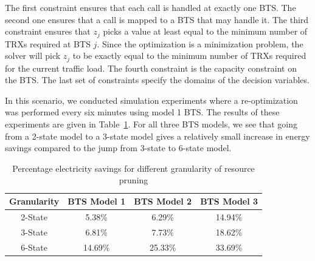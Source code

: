 The first constraint ensures that each call is handled at exactly one BTS. The second one ensures that a call is mapped to a BTS that may handle it. The third constraint ensures that $z_j$ picks a value at least equal to the minimum number of TRXs required at BTS $j$. Since the optimization is a minimization problem, the solver will pick $z_j$ to be exactly equal to the minimum number of TRXs required for the current traffic load. The fourth constraint is the capacity constraint on the BTS. The last set of constraints specify the domains of the decision variables.

In this scenario, we conducted simulation experiments where a re-optimization was performed every six minutes using model 1 BTS. The results of these experiments are given in Table~\ref{tab:granularityresults}. For all three BTS models, we see that going from a 2-state model to a 3-state model gives a relatively small increase in energy savings compared to the jump from 3-state to 6-state model.  

\begin{table}
\centering
\begin{tabular}{|c|c|c|c|}
\hline
Granularity & BTS Model 1 & BTS Model 2 & BTS Model 3\\
\hline 2-State & 5.38\% & 6.29\% &  14.94\% \\
\hline 3-State & 6.81\% & 7.73\% &  18.62\% \\
\hline 6-State & 14.69\% & 25.33\% &  33.69\% \\
\hline
\end{tabular}
\caption{Percentage electricity savings for different granularity of resource pruning}
\label{tab:granularityresults}
\end{table}


